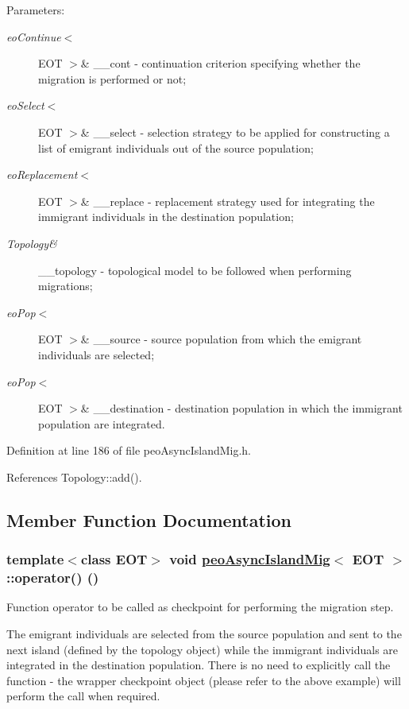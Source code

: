 \begin{Desc}
\item[Parameters:]
\begin{description}
\item[{\em eo\-Continue$<$}]EOT $>$\& \_\-\_\-cont - continuation criterion specifying whether the migration is performed or not; \item[{\em eo\-Select$<$}]EOT $>$\& \_\-\_\-select - selection strategy to be applied for constructing a list of emigrant individuals out of the source population; \item[{\em eo\-Replacement$<$}]EOT $>$\& \_\-\_\-replace - replacement strategy used for integrating the immigrant individuals in the destination population; \item[{\em Topology\&}]\_\-\_\-topology - topological model to be followed when performing migrations; \item[{\em eo\-Pop$<$}]EOT $>$\& \_\-\_\-source - source population from which the emigrant individuals are selected; \item[{\em eo\-Pop$<$}]EOT $>$\& \_\-\_\-destination - destination population in which the immigrant population are integrated. \end{description}
\end{Desc}


Definition at line 186 of file peo\-Async\-Island\-Mig.h.

References Topology::add().

\subsection{Member Function Documentation}
\hypertarget{classpeoAsyncIslandMig_13581e54425727a7f785ca8a6df527b5}{
\subsubsection[operator()]{\setlength{\rightskip}{0pt plus 5cm}template$<$class EOT$>$ void \hyperlink{classpeoAsyncIslandMig}{peo\-Async\-Island\-Mig}$<$ EOT $>$::operator() ()}}
\label{classpeoAsyncIslandMig_13581e54425727a7f785ca8a6df527b5}


Function operator to be called as checkpoint for performing the migration step. 

The emigrant individuals are selected from the source population and sent to the next island (defined by the topology object) while the immigrant individuals are integrated in the destination population. There is no need to explicitly call the function - the wrapper checkpoint object (please refer to the above example) will perform the call when required. 

